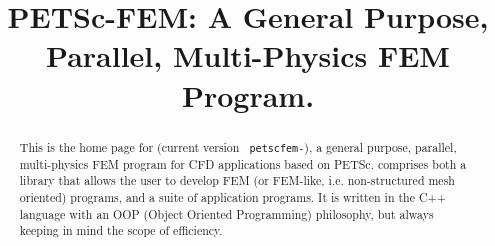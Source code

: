 \documentclass[11pt]{article}
\begin{document}
\sloppy

\title{PETSc-FEM: A General Purpose, Parallel, Multi-Physics FEM Program.}
\maketitle

\begin{abstract}
This is the home page for \pfem (current version {\tt
petscfem-\petscfemversion}), a general purpose, parallel,
multi-physics FEM program for CFD applications based on PETSc. \pfem{}
comprises both a library that allows the user to develop FEM (or
FEM-like, i.e. non-structured mesh oriented) programs, and a suite of
application programs. It is written in the C++ language with an OOP
(Object Oriented Programming) philosophy, but always keeping in mind
the scope of efficiency.
\end{abstract}
\end{document}
